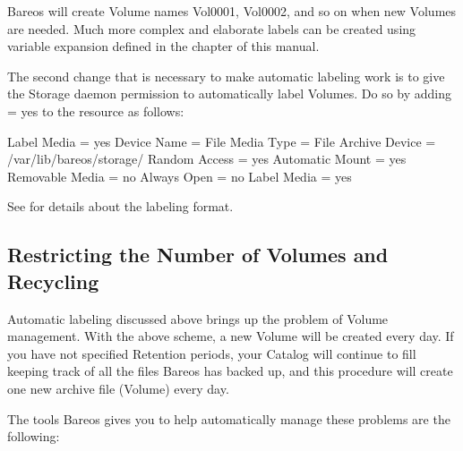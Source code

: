 Bareos will create Volume names Vol0001, Vol0002, and so on when new Volumes
are needed. Much more complex and elaborate labels can be created using
variable expansion defined in the
 chapter of this manual.

The second change that is necessary to make automatic labeling work is to give
the Storage daemon permission to automatically label Volumes. Do so by adding
 = yes to the  resource as follows:

\begin{bconfig}{Label Media = yes}
Device {
  Name = File
  Media Type = File
  Archive Device = /var/lib/bareos/storage/
  Random Access = yes
  Automatic Mount = yes
  Removable Media = no
  Always Open = no
  Label Media = yes
}
\end{bconfig}

See  for details about the labeling format.


\subsection{Restricting the Number of Volumes and Recycling}

Automatic labeling discussed above brings up the problem of Volume management.
With the above scheme, a new Volume will be created every day. If you have not
specified Retention periods, your Catalog will continue to fill keeping track
of all the files Bareos has backed up, and this procedure will create one new
archive file (Volume) every day.

The tools Bareos gives you to help automatically manage these problems are the
following:

